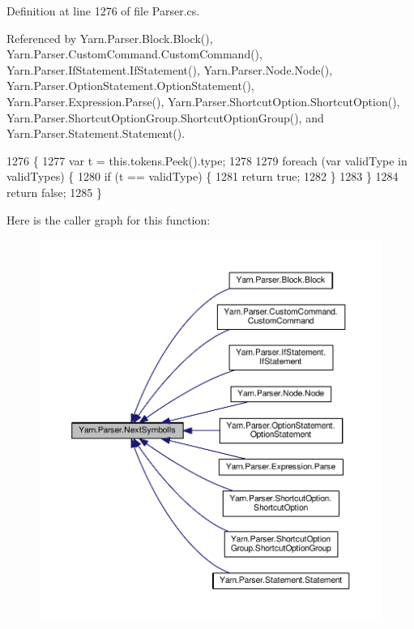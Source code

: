 Definition at line 1276 of file Parser.\-cs.



Referenced by Yarn.\-Parser.\-Block.\-Block(), Yarn.\-Parser.\-Custom\-Command.\-Custom\-Command(), Yarn.\-Parser.\-If\-Statement.\-If\-Statement(), Yarn.\-Parser.\-Node.\-Node(), Yarn.\-Parser.\-Option\-Statement.\-Option\-Statement(), Yarn.\-Parser.\-Expression.\-Parse(), Yarn.\-Parser.\-Shortcut\-Option.\-Shortcut\-Option(), Yarn.\-Parser.\-Shortcut\-Option\-Group.\-Shortcut\-Option\-Group(), and Yarn.\-Parser.\-Statement.\-Statement().


\begin{DoxyCode}
1276                                                          \{
1277             var t = this.tokens.Peek().type;
1278 
1279             \textcolor{keywordflow}{foreach} (var validType \textcolor{keywordflow}{in} validTypes) \{
1280                 \textcolor{keywordflow}{if} (t == validType) \{
1281                     \textcolor{keywordflow}{return} \textcolor{keyword}{true};
1282                 \}
1283             \}
1284             \textcolor{keywordflow}{return} \textcolor{keyword}{false};
1285         \}
\end{DoxyCode}


Here is the caller graph for this function\-:
\nopagebreak
\begin{figure}[H]
\begin{center}
\leavevmode
\includegraphics[width=350pt]{a00143_a666a945da1a7845b02b92592fccac291_icgraph}
\end{center}
\end{figure}



